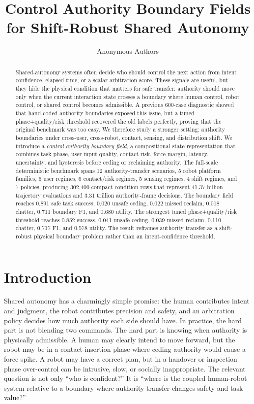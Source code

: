 \documentclass{article}
\title{Control Authority Boundary Fields for Shift-Robust Shared Autonomy}
\author{Anonymous Authors}
\begin{document}
\maketitle

\begin{abstract}
Shared-autonomy systems often decide who should control the next action from intent confidence, elapsed time, or a scalar arbitration score. These signals are useful, but they hide the physical condition that matters for safe transfer: authority should move only when the current interaction state crosses a boundary where human control, robot control, or shared control becomes admissible. A previous 600-case diagnostic showed that hand-coded authority boundaries exposed this issue, but a tuned phase+quality/risk threshold recovered the old labels perfectly, proving that the original benchmark was too easy. We therefore study a stronger setting: authority boundaries under cross-user, cross-robot, contact, sensing, and distribution shift. We introduce a \emph{control authority boundary field}, a compositional state representation that combines task phase, user input quality, contact risk, force margin, latency, uncertainty, and hysteresis before ceding or reclaiming authority. The full-scale deterministic benchmark spans 12 authority-transfer scenarios, 5 robot platform families, 6 user regimes, 6 contact/risk regimes, 5 sensing regimes, 4 shift regimes, and 7 policies, producing 302,400 compact condition rows that represent 41.37 billion trajectory evaluations and 3.31 trillion authority-frame decisions. The boundary field reaches 0.891 safe task success, 0.020 unsafe ceding, 0.022 missed reclaim, 0.018 chatter, 0.711 boundary F1, and 0.680 utility. The strongest tuned phase+quality/risk threshold reaches 0.852 success, 0.041 unsafe ceding, 0.039 missed reclaim, 0.110 chatter, 0.717 F1, and 0.578 utility. The result reframes authority transfer as a shift-robust physical boundary problem rather than an intent-confidence threshold.
\end{abstract}

\section{Introduction}

Shared autonomy has a charmingly simple promise: the human contributes intent and judgment, the robot contributes precision and safety, and an arbitration policy decides how much authority each side should have. In practice, the hard part is not blending two commands. The hard part is knowing when authority is physically admissible. A human may clearly intend to move forward, but the robot may be in a contact-insertion phase where ceding authority would cause a force spike. A robot may have a correct plan, but in a handover or inspection phase over-control can be intrusive, slow, or socially inappropriate. The relevant question is not only ``who is confident?'' It is ``where is the coupled human-robot system relative to a boundary where authority transfer changes safety and task value?''
\end{document}
